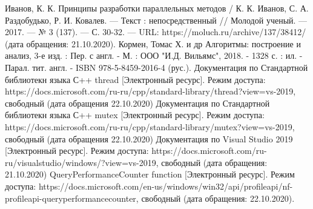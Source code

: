 \documentclass[12pt]{report}
\begin{document}
	\renewcommand\bibname{Список литературы}
	
	
	
	\newpage
	
	
	
	\newpage
	
	
	
%	
	
	\begin{thebibliography}{2}
		Иванов, К. К. Принципы разработки параллельных методов / К. К. Иванов, С. А. Раздобудько, Р. И. Ковалев. — Текст : непосредственный // Молодой ученый. — 2017. — № 3 (137). — С. 30-32. — URL: https://moluch.ru/archive/137/38412/ (дата обращения: 21.10.2020).
		 Кормен, Томас Х. и др Алгоритмы: построение и анализ, 3-е изд. : Пер. с англ. - М. : ООО "И.Д. Вильямс", 2018. - 1328 с. : ил. - Парал. тит. англ. -  ISBN 978-5-8459-2016-4 (рус.).
		 Документация по Стандартной библиотекн языка С++ thread [Электронный ресурс]. Режим доступа: https://docs.microsoft.com/ru-ru/cpp/standard-library/thread?view=vs-2019, свободный (дата обращения 22.10.2020)
		 Документация по Стандартной библиотекн языка С++ mutex [Электронный ресурс]. Режим доступа: https://docs.microsoft.com/ru-ru/cpp/standard-library/mutex?view=vs-2019, свободный (дата обращения 22.10.2020)
		 Документация по Visual Studio 2019 [Электронный ресурс]. Режим доступа: https://docs.microsoft.com/ru-ru/visualstudio/windows/?view=vs-2019, свободный (дата обращения: 21.10.2020)
		 QueryPerformanceCounter function [Электронный ресурс]. Режим доступа: https://docs.microsoft.com/en-us/windows/win32/api/profileapi/nf-profileapi-queryperformancecounter, свободный (дата обращения: 22.10.2020).
	\end{thebibliography}
\end{document}
